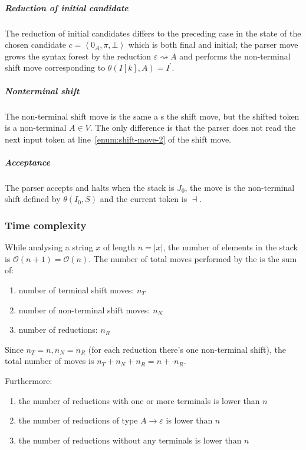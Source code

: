 \documentclass[english]{article}
\begin{document}
\subparagraph*{Reduction of initial candidate}

The reduction of initial candidates differs to the preceding case in the state of the chosen candidate \(c = \left\langle 0_A, \pi, \bot \right\rangle\) which is both final and initial;
the parser move grows the syntax forest by the reduction \(\varepsilon \rightsquigarrow A\) and performs the non-terminal shift move corresponding to \(\theta(I[k], A) = I^\prime\).

\subparagraph*{Nonterminal shift}

The non-terminal shift move is the same a s the shift move, but the shifted token is a non-terminal \(A \in V\).
The only difference is that the parser does not read the next input token at line~\ref{enum:shift-move-2} of the shift move.

\subparagraph*{Acceptance}

The parser accepts and halts when the stack is \(J_0\), the move is the non-terminal shift defined by \(\theta(I_0, S)\) and the current token is \(\dashv\).

\subsubsection{Time complexity}

While analysing a string \(x\) of length \(n = |x|\), the number of elements in the stack is \(\mathcal{O}(n+1)=\mathcal{O}(n)\).
The number of total moves performed by the \PDA is the sum of:

\begin{enumerate}
  \item number of terminal shift moves: \(n_T\)
  \item number of non-terminal shift moves: \(n_N\)
  \item number of reductions: \(n_R\)
\end{enumerate}

Since \(n_T = n, n_N=n_R\) (for each reduction there's one non-terminal shift), the total number of moves is \(n_T + n_N + n_R = n +  \cdot n_R\).

Furthermore:
\begin{enumerate}
  \item the number of reductions with one or more terminals is lower than \(n\)
  \item the number of reductions of type \(A \rightarrow \varepsilon\) is lower than \(n\)
  \item the number of reductions without any terminals is lower than \(n\)
\end{enumerate}
\end{document}
